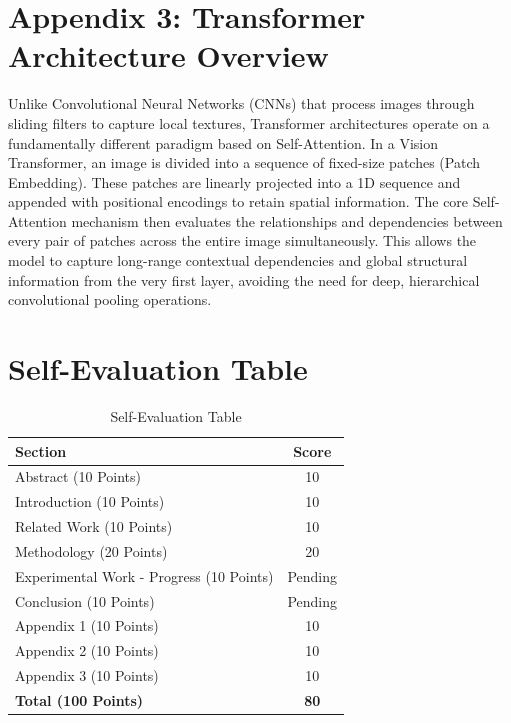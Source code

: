 \documentclass[conference]{IEEEtran}
\begin{document}
\section*{Appendix 3: Transformer Architecture Overview}
Unlike Convolutional Neural Networks (CNNs) that process images through sliding filters to capture local textures, Transformer architectures operate on a fundamentally different paradigm based on Self-Attention. In a Vision Transformer, an image is divided into a sequence of fixed-size patches (Patch Embedding). These patches are linearly projected into a 1D sequence and appended with positional encodings to retain spatial information. The core Self-Attention mechanism then evaluates the relationships and dependencies between every pair of patches across the entire image simultaneously. This allows the model to capture long-range contextual dependencies and global structural information from the very first layer, avoiding the need for deep, hierarchical convolutional pooling operations.

\section*{Self-Evaluation Table}
\begin{table}[htbp]
\caption{Self-Evaluation Table}
\begin{center}
\begin{tabular}{|l|c|}
\hline
\textbf{Section} & \textbf{Score} \\
\hline
Abstract (10 Points) & 10 \\
\hline
Introduction (10 Points) & 10 \\
\hline
Related Work (10 Points) & 10 \\
\hline
Methodology (20 Points) & 20 \\
\hline
Experimental Work - Progress (10 Points) & Pending \\
\hline
Conclusion (10 Points) & Pending \\
\hline
Appendix 1 (10 Points) & 10 \\
\hline
Appendix 2 (10 Points) & 10 \\
\hline
Appendix 3 (10 Points) & 10 \\
\hline
\textbf{Total (100 Points)} & \textbf{80} \\
\hline
\end{tabular}
\label{tab:self_eval}
\end{center}
\end{table}
\end{document}
